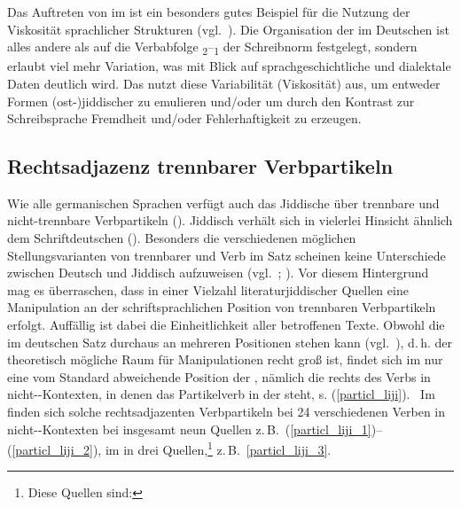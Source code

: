  
 Das Auftreten von \hai{{\VR}} im \hai{{\LiJi}} ist ein besonders gutes Beispiel für die 
Nutzung der Viskosität sprachlicher Strukturen (vgl.\, \citealt{Haider2007}). Die Organisation der \hai{{\RSK}} im Deutschen ist alles andere als auf die Verbabfolge \textsubscript{2}–\textsubscript{1}  der Schreibnorm festgelegt, sondern erlaubt viel mehr Variation, was mit Blick auf sprachgeschichtliche und dialektale Daten deutlich wird. Das \hai{{\LiJi}} nutzt diese Variabilität (Viskosität) aus, um entweder Formen (ost-)jiddischer  zu emulieren und/oder um durch den Kontrast zur Schreibsprache Fremdheit und/oder Fehlerhaftigkeit zu erzeugen. 

 
 
 
 
  \subsection{Rechtsadjazenz trennbarer Verbpartikeln}\label{rechtsadjazent}
Wie alle germanischen Sprachen 
verfügt auch das Jiddische über %
trennbare und nicht-trennbare Verb\-partikeln (\citealt[33–49]{Vikner2001}). Jiddisch verhält sich in vielerlei Hinsicht ähnlich dem Schriftdeutschen (\citealt[33–49]{Vikner2001}). Besonders die verschiedenen möglichen Stellungsvarianten von trennbarer  und Verb im Satz scheinen keine Unterschiede zwischen Deutsch und Jiddisch aufzuweisen (vgl.\, \citealt[38f]{Heine2010}; \citealt[33–49]{Vikner2001}). Vor diesem Hintergrund mag es überraschen, dass in einer Vielzahl literaturjiddischer Quellen eine Manipulation an der schriftsprachlichen Position von trennbaren Verbpartikeln erfolgt. Auffällig ist dabei die Einheitlichkeit aller betroffenen Texte. Obwohl die  im deutschen Satz durchaus an mehreren Positionen stehen kann (vgl.\, \citealt{Heine2010,Luedeling2001}), d.\,h. der theoretisch mögliche Raum für Manipulationen recht groß ist, findet sich im \hai{{\LiJi}} nur eine vom Standard abweichende Position der , nämlich die rechts des Verbs in nicht--Kontexten, in denen das Partikelverb in der \hai{{\RSK}} steht, s. (\ref{particl_liji}). \,%
 Im  finden sich solche rechtsadjazenten Verbpartikeln bei 24 verschiedenen Verben in nicht--Kontexten bei insgesamt neun Quellen z.\,B.\, (\ref{particl_liji_1})–(\ref{particl_liji_2}), im  in drei Quellen,\footnote{Diese Quellen sind: } z.\,B.\, \ref{particl_liji_3}. 

